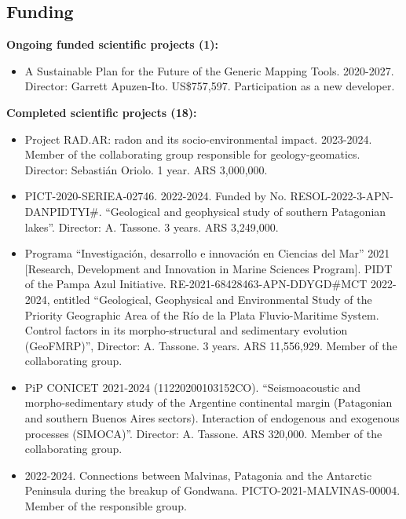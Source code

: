 \documentclass[11pt, a4paper]{article}
\begin{document}
\subsection{Funding}

\textbf{Ongoing funded scientific projects (1):}

\begin{itemize}
  \item A Sustainable Plan for the Future of the Generic Mapping Tools. 2020-2027. Director: Garrett Apuzen-Ito. US\$757,597. Participation as a new developer.
\end{itemize}

\textbf{Completed scientific projects (18):}

\begin{itemize}
  \item Project RAD.AR: radon and its socio-environmental impact. 2023-2024. Member of the collaborating group responsible for geology-geomatics. Director: Sebastián Oriolo. 1 year. ARS 3,000,000.

  \item PICT-2020-SERIEA-02746. 2022-2024. Funded by No. RESOL-2022-3-APN-DANPIDTYI\#. “Geological and geophysical study of southern Patagonian lakes”. Director: A. Tassone. 3 years. ARS 3,249,000.

  \item Programa “Investigación, desarrollo e innovación en Ciencias del Mar” 2021 [Research, Development and Innovation in Marine Sciences Program]. PIDT of the Pampa Azul Initiative. RE-2021-68428463-APN-DDYGD\#MCT 2022-2024, entitled “Geological, Geophysical and Environmental Study of the Priority Geographic Area of the Río de la Plata Fluvio-Maritime System. Control factors in its morpho-structural and sedimentary evolution (GeoFMRP)”, Director: A. Tassone. 3 years. ARS 11,556,929. Member of the collaborating group.

  \item PiP CONICET 2021-2024 (11220200103152CO). “Seismoacoustic and morpho-sedimentary study of the Argentine continental margin (Patagonian and southern Buenos Aires sectors). Interaction of endogenous and exogenous processes (SIMOCA)”. Director: A. Tassone. ARS 320,000. Member of the collaborating group.

  \item 2022-2024. Connections between Malvinas, Patagonia and the Antarctic Peninsula during the breakup of Gondwana. PICTO-2021-MALVINAS-00004. Member of the responsible group.


\end{itemize}
\end{document}
